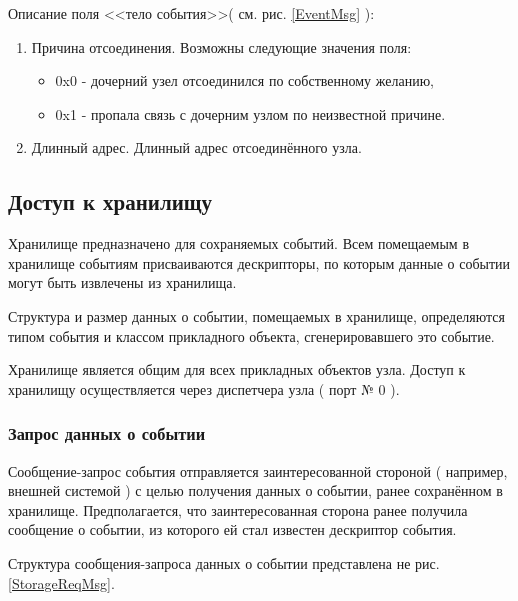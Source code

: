 Описание поля <<тело события>>( см. рис. \ref{EventMsg} ):
\begin{enumerate}
\item Причина отсоединения. Возможны следующие значения поля:
\begin{itemize}
\item 0x0 - дочерний узел отсоединился по собственному желанию,
\item 0x1 - пропала связь с дочерним узлом по неизвестной причине.
\end{itemize}
\item Длинный адрес. Длинный адрес отсоединённого узла. 
\end{enumerate}

\subsection{Доступ к хранилищу}
\label{StorageAccess}

Хранилище предназначено для сохраняемых событий. Всем помещаемым в хранилище
событиям присваиваются дескрипторы, по которым данные о событии  могут быть
извлечены из хранилища.

Структура и размер данных о событии, помещаемых в хранилище, определяются 
типом события и классом прикладного объекта, сгенерировавшего это событие.

Хранилище является общим для всех прикладных объектов узла. Доступ к хранилищу
осуществляется через диспетчера узла ( порт № 0 ).

\subsubsection{Запрос данных о событии}

Сообщение-запрос события отправляется заинтересованной стороной ( например, внешней
системой ) с целью получения данных о событии, ранее сохранённом в хранилище. Предполагается, что
заинтересованная сторона ранее получила сообщение о событии, из которого ей стал известен дескриптор 
события.

Структура сообщения-запроса данных о событии представлена не рис. \ref{StorageReqMsg}.

